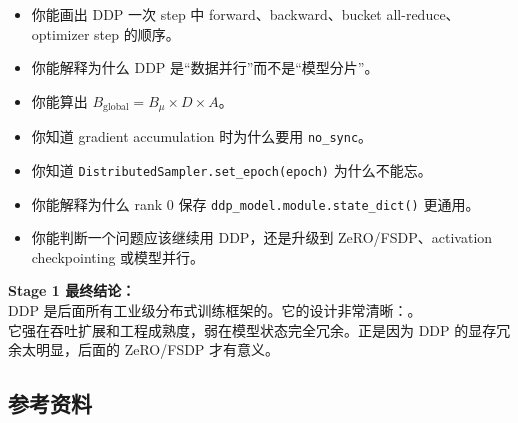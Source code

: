 \begin{itemize}[leftmargin=1.5em]
  \item 你能画出 DDP 一次 step 中 forward、backward、bucket all-reduce、optimizer step 的顺序。
  \item 你能解释为什么 DDP 是“数据并行”而不是“模型分片”。
  \item 你能算出 $B_{\text{global}} = B_{\mu} \times D \times A$。
  \item 你知道 gradient accumulation 时为什么要用 \texttt{no\_sync}。
  \item 你知道 \texttt{DistributedSampler.set\_epoch(epoch)} 为什么不能忘。
  \item 你能解释为什么 rank 0 保存 \texttt{ddp\_model.module.state\_dict()} 更通用。
  \item 你能判断一个问题应该继续用 DDP，还是升级到 ZeRO/FSDP、activation checkpointing 或模型并行。
\end{itemize}

\begin{summarybox}
\textbf{Stage 1 最终结论：}\\
DDP 是后面所有工业级分布式训练框架的。它的设计非常清晰：。\\
它强在吞吐扩展和工程成熟度，弱在模型状态完全冗余。正是因为 DDP 的显存冗余太明显，后面的 ZeRO/FSDP 才有意义。
\end{summarybox}

\subsection{参考资料}

